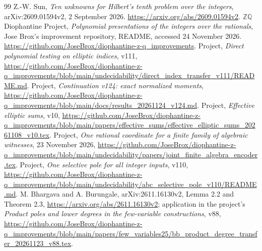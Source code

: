 \documentclass[11pt]{article}
\newcommand{\Q}{\mathbb Q}\newcommand{\Z}{\mathbb Z}\newcommand{\N}{\mathbb N}
\begin{document}
\begin{thebibliography}{99}
 Z.-W. Sun, \emph{Ten unknowns for Hilbert's tenth problem over the integers}, arXiv:2609.01594v2, 2 September 2026.
\url{https://arxiv.org/abs/2609.01594v2}.
 $\Z\Q$ Diophantine Project, \emph{Polynomial presentations of the integers over the rationals}, Jose Brox's improvement repository, README, accessed 24 November 2026.
\url{https://github.com/JoseBrox/diophantine-z-q_improvements}.
 Project, \emph{Direct polynomial testing on elliptic indices}, v111, \url{https://github.com/JoseBrox/diophantine-z-q_improvements/blob/main/undecidability/direct_index_transfer_v111/README.md}.
 Project, \emph{Continuation v124: exact normalized moments}, \url{https://github.com/JoseBrox/diophantine-z-q_improvements/blob/main/docs/results_20261124_v124.md}.
 Project, \emph{Effective elliptic sums}, v10, \url{https://github.com/JoseBrox/diophantine-z-q_improvements/blob/main/papers/effective_sums/effective_elliptic_sums_20261108_v10.tex}.
 Project, \emph{One rational coordinate for a finite family of algebraic witnesses}, 23 November 2026, \url{https://github.com/JoseBrox/diophantine-z-q_improvements/blob/main/undecidability/papers/joint_finite_algebra_encoder.tex}.
 Project, \emph{One selective pole for all integer inputs}, v110, \url{https://github.com/JoseBrox/diophantine-z-q_improvements/blob/main/undecidability/abc_selective_pole_v110/README.md}.
 M. Bhargava and A. Burungale, arXiv:2611.16130v2, Lemma 2.2 and Theorem 2.3, \url{https://arxiv.org/abs/2611.16130v2}; application in the project's \emph{Product poles and lower degrees in the few-variable constructions}, v88, \url{https://github.com/JoseBrox/diophantine-z-q_improvements/blob/main/papers/few_variables25/bb_product_degree_transfer_20261123_v88.tex}.
\end{thebibliography}
\end{document}
